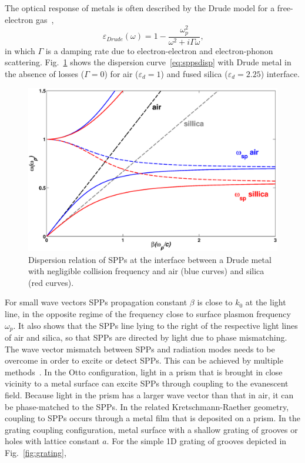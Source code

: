 The optical response of metals is often described by the Drude model for a free-electron gas~\cite{kittel1976introduction},
\begin{equation}
\varepsilon_{Drude}(\omega)=1-\frac{\omega_p^2}{\omega^2+i\Gamma\omega}\text{,}
\end{equation}
in which $\Gamma$ is a damping rate due to electron-electron and electron-phonon scattering.
Fig.~\ref{fig:SPPdisp} shows the dispersion curve~\ref{eq:sppsdisp} with Drude metal  in the absence of losses ($\Gamma=0$) for air ($\varepsilon_d = 1$) and fused silica ($\varepsilon_d = 2.25$) interface.
\begin{figure}[htb]
\centering
\includegraphics[scale=0.4]{THM/SPPdisp.eps}
\caption{\label{fig:SPPdisp}Dispersion relation of SPPs at the interface between a Drude metal with negligible collision frequency and air (blue curves) and silica (red curves).}
\end{figure}
For small wave vectors SPPs propagation constant $\beta$ is close to $k_0$ at the light line, in the opposite regime of the frequency close to surface plasmon frequency $\omega_p$. It also shows that the SPPs line lying to the right of the respective light lines of air and silica, so that SPPs are directed by light due to phase mismatching. The wave vector mismatch between SPPs and radiation modes needs to be overcome in order to excite or detect SPPs. This can be achieved by multiple methods~\cite{raether1988surface}. In the Otto configuration, light in a prism that is brought in close vicinity to a metal surface can excite SPPs through coupling to the evanescent field. Because light in the prism has a larger wave vector than that in air, it can be phase-matched to the SPPs. In the related Kretschmann-Raether geometry, coupling to SPPs occurs through a metal film that is deposited on a prism. In the grating coupling configuration, metal surface with a shallow grating of grooves or holes with lattice constant $a$. For the simple 1D grating of grooves depicted in Fig.~\ref{fig:grating},
